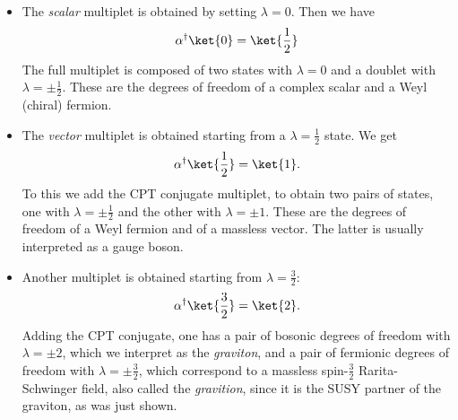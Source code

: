 \begin{example}
  \mbox{}
  \begin{itemize}
    \item The \textit{scalar} multiplet is obtained by setting $\lambda =0$.
      Then we have 
      \begin{equation}
        \alpha^\dagger\ket{0} = \ket{\frac{1}{2}}
      \end{equation}
      The full multiplet is composed of two states with $\lambda = 0 $ and
      a doublet with $\lambda = \pm\frac{1}{2}$. These are the degrees of
      freedom of a complex scalar and a Weyl (chiral) fermion.
    \item The \textit{vector} multiplet is obtained starting from a $\lambda
      = \frac{1}{2}$ state. We get
      \begin{equation}
        \alpha^\dagger\ket{\frac{1}{2}} = \ket{1}.
      \end{equation}
      To this we add the CPT conjugate multiplet, to obtain two pairs of
      states, one with $\lambda = \pm\frac{1}{2}$ and the other with $\lambda
      = \pm 1$. These are the degrees of freedom of a Weyl fermion and of
      a massless vector. The latter is usually interpreted as a gauge boson.
    \item Another multiplet is obtained starting from $\lambda = \frac{3}{2}$:
      \begin{equation}
        \alpha^\dagger\ket{\frac{3}{2}} = \ket{2}.
      \end{equation}
      Adding the CPT conjugate, one has a pair of bosonic degrees of freedom
      with $\lambda = \pm 2$, which we interpret as the \textit{graviton}, and
      a pair of fermionic degrees of freedom with $\lambda =\pm\frac{3}{2}$,
      which correspond to a massless spin-$\frac{3}{2}$ Rarita-Schwinger field,
      also called the \textit{gravition}, since it is the SUSY partner of the
      graviton, as was just shown.
  \end{itemize}
\end{example}
